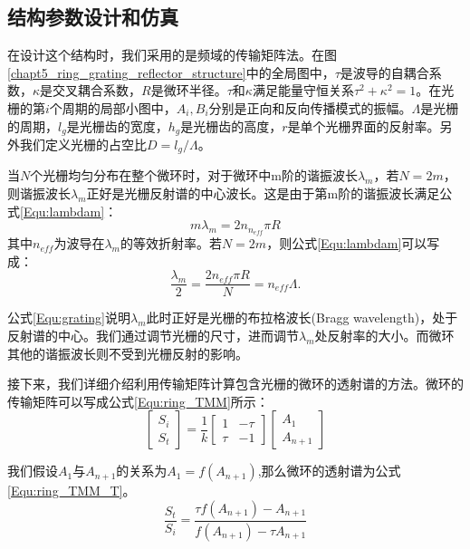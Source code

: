 \subsection{结构参数设计和仿真}
在设计这个结构时，我们采用的是频域的传输矩阵法\cite{yariv2006photonics}。在图\ref{chapt5_ring_grating_reflector_structure}中的全局图中，$\tau$是波导的自耦合系数，$\kappa$是交叉耦合系数，$R$是微环半径。$\tau$和$\kappa$满足能量守恒关系$\tau^2+\kappa^2=1$。在光栅的第$i$个周期的局部小图中，$A_i, B_i$分别是正向和反向传播模式的振幅。$\Lambda$是光栅的周期，$l_g$是光栅齿的宽度，$h_g$是光栅齿的高度，$r$是单个光栅界面的反射率。另外我们定义光栅的占空比$D=l_g/\Lambda$。

当$N$个光栅均匀分布在整个微环时，对于微环中m阶的谐振波长$\lambda_m$，若$N = 2m$，则谐振波长$\lambda_m$正好是光栅反射谱的中心波长。这是由于第m阶的谐振波长满足公式\ref{Equ:lambdam}：
\begin{equation}
\label{Equ:lambdam}
m\lambda_m = 2n_{n_{eff}}\pi R
\end{equation}
其中$n_{eff}$为波导在$\lambda_m$的等效折射率。若$N=2m$，则公式\ref{Equ:lambdam}可以写成：
\begin{equation}
\label{Equ:grating}
\frac{\lambda_m}{2}=\frac{2n_{eff}\pi R}{N}=n_{eff}\Lambda.
\end{equation}

公式\ref{Equ:grating}说明$\lambda_m$此时正好是光栅的布拉格波长(Bragg wavelength)，处于反射谱的中心。我们通过调节光栅的尺寸，进而调节$\lambda_m$处反射率的大小。而微环其他的谐振波长则不受到光栅反射的影响。 

接下来，我们详细介绍利用传输矩阵计算包含光栅的微环的透射谱的方法。微环的传输矩阵可以写成公式\ref{Equ:ring_TMM}所示：
\begin{equation}
\label{Equ:ring_TMM}
\begin{bmatrix}
S_{i}\\
S_{t}
\end{bmatrix} =\frac{1}{k}\begin{bmatrix}
1 & -\tau\\
\tau & -1
\end{bmatrix}
\begin{bmatrix}
A_{1}\\
A_{n+1}
\end{bmatrix}
\end{equation}

我们假设$A_1$与$A_{n+1}$的关系为$A_1=f(A_{n+1})$,那么微环的透射谱为公式\ref{Equ:ring_TMM_T}。
\begin{equation}
\label{Equ:ring_TMM_T}
\frac{S_t}{S_i}=\frac{\tau f(A_{n+1})-A_{n+1}}{f(A_{n+1})-\tau A_{n+1}}
\end{equation}

